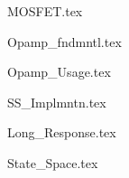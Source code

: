 \documentclass[a4paper, 12pt]{report}
\begin{document}
\begin{center}
\begin{comment}
Start Level: Chapter
End Level: Chapter
Aditional Comments:
Rotational Kinematics
\end{comment}
{MOSFET.tex}
\begin{comment}
Start Level: Chapter
End Level: Chapter
Aditional Comments:
\end{comment}
{Opamp_fndmntl.tex}
\begin{comment}
Start Level: Chapter
End Level: Chapter
Aditional Comments:
\end{comment}
{Opamp_Usage.tex}
\begin{comment}
Start Level: Chapter
End Level: Chapter
Aditional Comments:
\end{comment}
{SS_Implmntn.tex}
\begin{comment}
Start Level: Chapter
End Level: Chapter
Aditional Comments:
\end{comment}
{Long_Response.tex}
\begin{comment}
Start Level: Chapter
End Level: Chapter
Aditional Comments:
\end{comment}
{State_Space.tex}
\begin{comment}
Start Level: Chapter
End Level: Chapter
Aditional Comments:
\end{comment}
\end{center}
\end{document}
